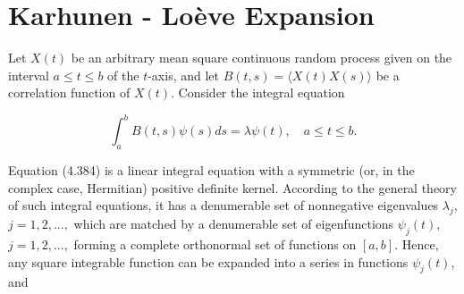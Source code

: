 \documentclass{article}
\begin{document}
\section{Karhunen - Loève Expansion}

Let $X(t)$ be an arbitrary mean square continuous random process given on the interval $a \leq t \leq b$ of the $t$-axis, and let $B(t,s) = \langle X(t)X(s) \rangle$ be a correlation function of $X(t)$. Consider the integral equation

\begin{equation}
\int_a^b B(t,s)\psi(s)ds = \lambda\psi(t), \quad a \leq t \leq b.
\end{equation}

Equation (4.384) is a linear integral equation with a symmetric (or, in the complex case, Hermitian) positive definite kernel. According to the general theory of such integral equations, it has a denumerable set of nonnegative eigenvalues $\lambda_j$, $j = 1, 2, ...,$ which are matched by a denumerable set of eigenfunctions $\psi_j(t)$, $j = 1, 2, ...,$ forming a complete orthonormal set of functions on $[a,b]$. Hence, any square integrable function can be expanded into a series in functions $\psi_j(t)$, and
\end{document}
